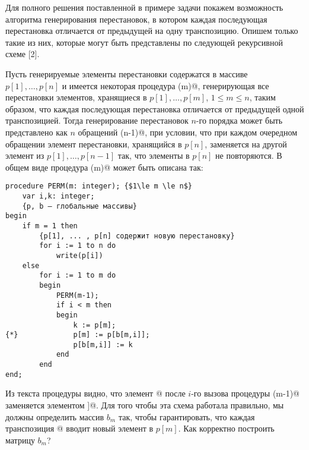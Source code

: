\documentclass[12pt,a4paper]{article}
\theoremstyle{plain}
\theoremstyle{definition}
\theoremstyle{remark}
\begin{document}
Для полного решения поставленной в примере задачи покажем возможность алгоритма генерирования перестановок, в котором каждая последующая перестановка отличается от предыдущей на одну транспозицию. Опишем только такие из них, которые могут быть представлены по следующей рекурсивной схеме [2].

Пусть генерируемые элементы перестановки содержатся в массиве $p[1],\ldots,p[n]$ и имеется некоторая процедура \verb@PERM(m)@, генерирующая все перестановки элементов, хранящиеся в $p[1],\ldots,p[m]$, $1 \le m \le n$, таким образом, что каждая последующая перестановка отличается от предыдущей одной транспозицией. Тогда генерирование перестановок $n$-го порядка может быть представлено как $n$ обращений \verb@PERM(n-1)@, при условии, что при каждом очередном обращении элемент перестановки, хранящийся в $p[n]$, заменяется на другой элемент из $p[1],\ldots,p[n-1]$ так, что элементы в $p[n]$ не повторяются. В общем виде процедура \verb@PERM(m)@ может быть описана так:

\begin{verbatim}
procedure PERM(m: integer); {$1\le m \le n$}
    var i,k: integer;
    {p, b — глобальные массивы}
begin
    if m = 1 then
        {p[1], ... , p[n] содержит новую перестановку}
        for i := 1 to n do
            write(p[i])
    else
        for i := 1 to m do
        begin
            PERM(m-1);
            if i < m then
            begin
                k := p[m];
{*}             p[m] := p[b[m,i]];
                p[b[m,i]] := k
            end
        end
end;
\end{verbatim}

Из текста процедуры видно, что элемент \verb@p[m]@ после $i$-го вызова процедуры \verb@PERM(m-1)@ заменяется элементом \verb@p[b[m,i]]@. Для того чтобы эта схема работала правильно, мы должны определить массив $b_m$ так, чтобы гарантировать, что каждая транспозиция \verb@{*}@ вводит новый элемент в $p[m]$. Как корректно построить матрицу $b_m$?
\end{document}
